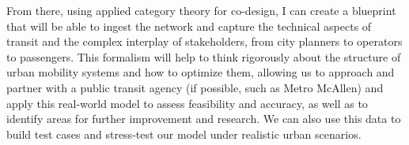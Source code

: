 From there, using applied category theory for co-design, I can create a blueprint that will be able to ingest the network and capture the technical aspects of transit and the complex interplay of stakeholders, from city planners to operators to passengers. This formalism will help to think rigorously about the structure of urban mobility systems and how to optimize them, allowing us to approach and partner with a public transit agency (if possible, such as Metro McAllen) and apply this real-world model to assess feasibility and accuracy, as well as to identify areas for further improvement and research. We can also use this data to build test cases and stress-test our model under realistic urban scenarios.
